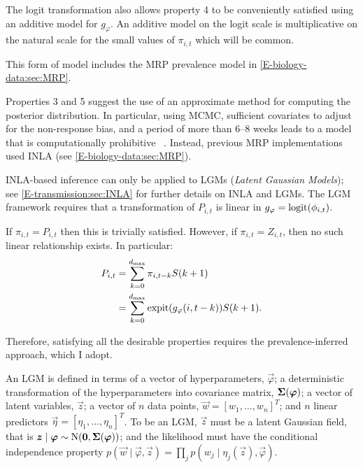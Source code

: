 \documentclass[thesis.tex]{subfiles}
\begin{document}
The logit transformation also allows property 4 to be conveniently satisfied using an additive model for $g_\varphi$.
An additive model on the logit scale is multiplicative on the natural scale for the small values of $\pi_{i,t}$ which will be common.

This form of model includes the MRP prevalence model in \cref{E-biology-data:sec:MRP}.




Properties 3 and 5 suggest the use of an approximate method for computing the posterior distribution.
In particular, using MCMC, sufficient covariates to adjust for the non-response bias, and a period of more than 6--8 weeks leads to a model that is computationally prohibitive ~.
Instead, previous MRP implementations used INLA (see \cref{E-biology-data:sec:MRP}).

INLA-based inference can only be applied to LGMs (\emph{Latent Gaussian Models}); see \cref{E-transmission:sec:INLA} for further details on INLA and LGMs.
The LGM framework requires that a transformation of $P_{i,t}$ is linear in $g_\varphi = \operatorname{logit}(\phi_{i,t})$.

If $\pi_{i,t} = P_{i,t}$ then this is trivially satisfied.
However, if $\pi_{i,t} = Z_{i,t}$, then no such linear relationship exists.
In particular:
\begin{align}
    P_{i,t}
    &= \sum_{k=0}^{d_\text{max}} \pi_{i,t-k} S(k+1) \\
    &= \sum_{k=0}^{d_\text{max}} \operatorname{expit}(g_\varphi(i, t-k)) S(k+1).
\end{align}

Therefore, satisfying all the desirable properties requires the prevalence-inferred approach, which I adopt.


An LGM is defined in terms of a vector of hyperparameters, $\vec{\varphi}$; a deterministic transformation of the hyperparameters into covariance matrix, $\bm{\Sigma}(\bm{\varphi})$; a vector of latent variables, $\vec{z}$; a vector of $n$ data points, $\vec{w} = [w_1, \dots, w_n]^T$; and $n$ linear predictors $\vec{\eta} = [\eta_1, \dots, \eta_n]^T$.
To be an LGM, $\vec{z}$ must be a latent Gaussian field, that is $\bm{z} \mid \bm{\varphi} \sim \operatorname{N}(\bm{0}, \bm{\Sigma}(\bm{\varphi}))$; and the likelihood must have the conditional independence property $p(\vec{w} \mid \vec{\varphi}, \vec{z}) = \prod_j p(w_j \mid \eta_j(\vec{z}), \vec{\varphi})$.
\end{document}
